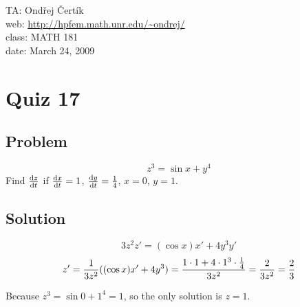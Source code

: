\documentclass[10pt]{article}
\begin{document}
\noindent TA: Ondřej Čertík\\
web: \url{http://hpfem.math.unr.edu/~ondrej/}\\
class: MATH 181\\
date: March 24, 2009

\section*{Quiz 17}

\subsection*{Problem}

$$z^3 = \sin x + y^4$$
Find ${{\rm d} z\over {\rm d} t}$ if ${{\rm d} x\over {\rm d} t}=1$, ${{\rm d} y\over {\rm d} t}={1\over4}$,
$x=0$, $y=1$.

\subsection*{Solution}

$$3z^2z' = (\cos x) x'+4y^3y'$$
$$z' = {1\over 3z^2} ( (\cos x) x'+4y^3)={1\cdot 1+4\cdot1^3\cdot{1\over4}
\over3z^2}={2\over 3z^2}={2\over 3}$$

Because $z^3 = \sin 0 + 1^4 = 1$, so the only solution is $z=1$.
\end{document}
